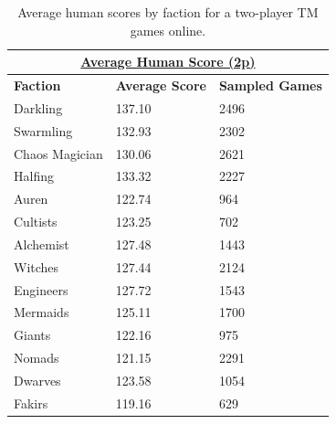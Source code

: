 \documentclass[10pt,twocolumn,letterpaper]{article}
\begin{document}
\begin{table}[h!]
\begin{tabular}{|l|l|l|}
\hline
\multicolumn{3}{|c|}{{\ul \textbf{Average Human Score (2p)}}}      \\ \hline
\textbf{Faction} & \textbf{Average Score} & \textbf{Sampled Games} \\ \hline
Darkling         & 137.10                 & 2496                   \\ \hline
Swarmling        & 132.93                 & 2302                   \\ \hline
Chaos Magician   & 130.06                 & 2621                   \\ \hline
Halfing          & 133.32                 & 2227                   \\ \hline
Auren            & 122.74                 & 964                    \\ \hline
Cultists         & 123.25                 & 702                    \\ \hline
Alchemist        & 127.48                 & 1443                   \\ \hline
Witches          & 127.44                 & 2124                   \\ \hline
Engineers        & 127.72                 & 1543                   \\ \hline
Mermaids         & 125.11                 & 1700                   \\ \hline
Giants           & 122.16                 & 975                    \\ \hline
Nomads           & 121.15                 & 2291                   \\ \hline
Dwarves          & 123.58                 & 1054                   \\ \hline
Fakirs           & 119.16                 & 629                    \\ \hline
\end{tabular}
\caption{Average human scores by faction for a two-player TM games online.}
\label{table:average_2p_score}
\end{table}
\end{document}
